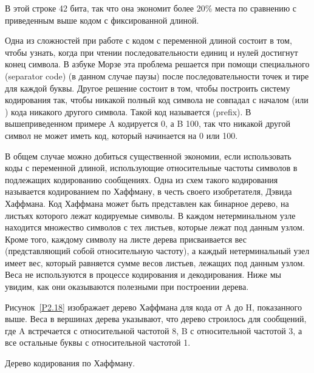 В этой строке 42 бита, так что она экономит более 20\% места по
сравнению с приведенным выше кодом с фиксированной длиной.

Одна из сложностей при работе с кодом с переменной длиной
состоит в том, чтобы узнать, когда при чтении последовательности
единиц и нулей достигнут конец символа.  В азбуке Морзе эта проблема
решается при помощи специального 
 (separator code) (в данном случае паузы)
после последовательности точек и тире для каждой буквы.  Другое
решение состоит в том, чтобы построить систему кодирования так, чтобы никакой полный
код символа не совпадал с началом (или ) кода никакого другого
символа. Такой код называется 
(prefix).  В вышеприведенном примере A кодируется 0, а B 100, так
что никакой другой символ не может иметь код, который начинается на 0
или 100.

В общем случае можно добиться существенной экономии, если
использовать коды с переменной длиной, использующие относительные
частоты символов в подлежащих кодированию сообщениях.  Одна из
схем такого кодирования называется кодированием по
Хаффману, в честь своего изобретателя, Дэвида
Хаффмана. 
Код Хаффмана может быть представлен как 
бинарное  дерево, на
листьях которого лежат кодируемые символы.  В 
каждом нетерминальном узле находится множество символов с тех листьев, 
которые лежат под данным узлом.  Кроме того, каждому символу 
на листе дерева присваивается вес (представляющий собой относительную
частоту), а каждый нетерминальный узел имеет вес, который равняется
сумме весов листьев, лежащих под данным узлом.  Веса не используются
в процессе кодирования и декодирования.  Ниже мы увидим, как они
оказываются полезными при построении дерева.

Рисунок~\ref{P2.18} изображает дерево Хаффмана
для кода от A до H, показанного выше.  Веса в вершинах
дерева указывают, что дерево строилось для сообщений, где A
встречается с относительной частотой 8, B с относительной частотой 3,
а все остальные буквы с относительной частотой 1.


\begin{cntrfig}

\caption{Дерево кодирования по Хаффману.}
\label{P2.18}

\end{cntrfig}

